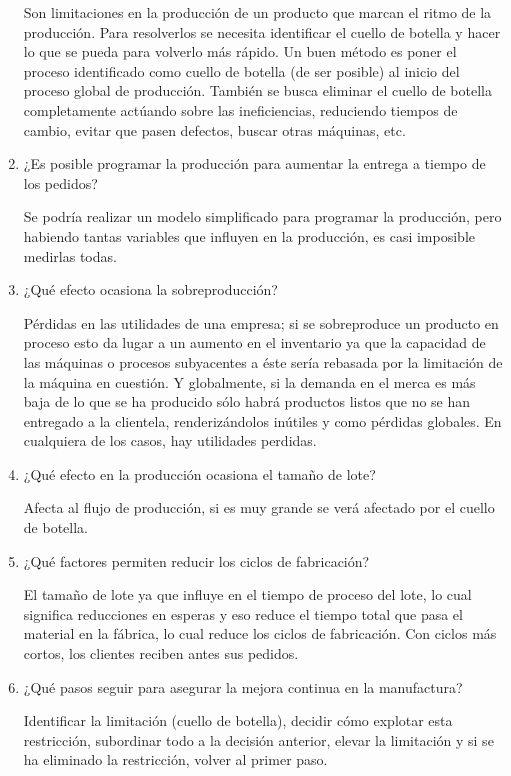 \documentclass[12pt, letterpaper]{article}
\begin{document}
\begin{enumerate}
		Son limitaciones en la producción de un producto que marcan el ritmo de la producción. Para resolverlos se necesita identificar el cuello de botella y hacer lo que se pueda para volverlo más rápido. Un buen método es poner el proceso identificado como cuello de botella (de ser posible) al inicio del proceso global de producción. También se busca eliminar el cuello de botella completamente actúando sobre las ineficiencias, reduciendo tiempos de cambio, evitar que pasen defectos, buscar otras máquinas, etc. 

	\item ¿Es posible programar la producción para aumentar la entrega a tiempo de los pedidos?

		Se podría realizar un modelo simplificado para programar la producción, pero habiendo tantas variables que influyen en la producción, es casi imposible medirlas todas.

	\item ¿Qué efecto ocasiona la sobreproducción?

		Pérdidas en las utilidades de una empresa; si se sobreproduce un producto en proceso esto da lugar a un aumento en el inventario ya que la capacidad de las máquinas o procesos subyacentes a éste sería rebasada por la limitación de la máquina en cuestión. Y globalmente, si la demanda en el merca es más baja de lo que se ha producido sólo habrá productos listos que no se han entregado a la clientela, renderizándolos inútiles y como pérdidas globales. En cualquiera de los casos, hay utilidades perdidas.

	\item ¿Qué efecto en la producción ocasiona el tamaño de lote?

		Afecta al flujo de producción, si es muy grande se verá afectado por el cuello de botella.

	\item ¿Qué factores permiten reducir los ciclos de fabricación?

		El tamaño de lote ya que influye en el tiempo de proceso del lote, lo cual significa reducciones en esperas y eso reduce el tiempo total que pasa el material en la fábrica, lo cual reduce los ciclos de fabricación. Con ciclos más cortos, los clientes reciben antes sus pedidos.

	\item ¿Qué pasos seguir para asegurar la mejora continua en la manufactura?

		Identificar la limitación (cuello de botella), decidir cómo explotar esta restricción, subordinar todo a la decisión anterior, elevar la limitación y si se ha eliminado la restricción, volver al primer paso.


\end{enumerate}
\end{document}
